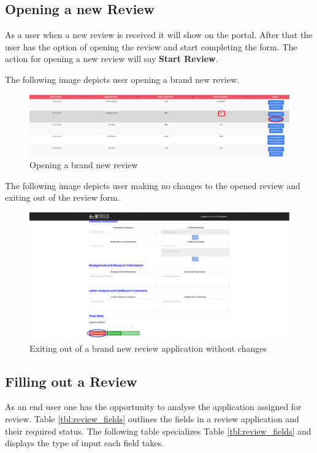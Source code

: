 \documentclass[fontsize=12pt,paper=letter,twoside]{scrartcl}
\begin{document}
\clearpage
\newpage
\subsection{Opening a new Review}
As a user when a new review is received it will show on the portal. After that the user has the option of opening the review and start completing the form. The action for opening a new review will say \textbf{Start Review}.

\bigskip
\noindent The following image depicts user opening a brand new review.

\begin{figure}[!htb]
\begin{center}
\includegraphics[width=.9\textwidth]{images/opening_new_review.png}
\end{center}
\caption{Opening a brand new review}
\label{fig:opening_new_review}
\end{figure}

\bigskip
\noindent The following image depicts user making no changes to the opened review and exiting out of the review form.

\begin{figure}[!htb]
\begin{center}
\includegraphics[width=.9\textwidth]{images/new_review_exit_wo_changes.png}
\end{center}
\caption{Exiting out of a brand new review application without changes}
\label{fig:new_review_exit_w/o_changes}
\end{figure}

\subsection{Filling out a Review}
As an end user one has the opportunity to analyse the application assigned for review. Table \ref{tbl:review_fields} outlines the fields in a review application and their required status. The following table specializes Table \ref{tbl:review_fields} and displays the type of input each field takes.
\end{document}
